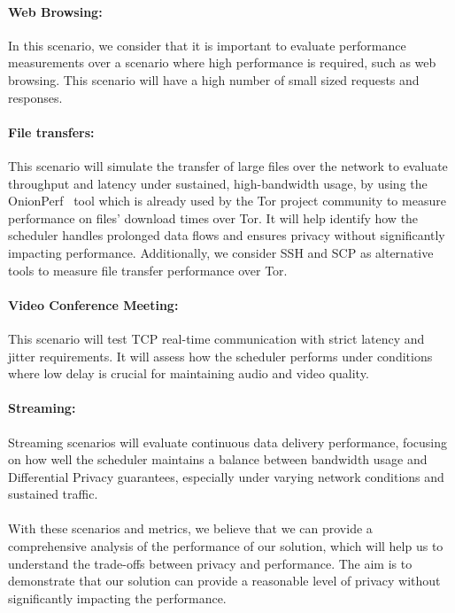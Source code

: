 \paragraph{Web Browsing:} In this scenario, we consider that it is important to evaluate performance measurements over a scenario where high performance is required, such as web browsing. This scenario will have a high number of small sized requests and responses. 

\paragraph{File transfers:} This scenario will simulate the transfer of large files over the network to evaluate throughput and latency under sustained, high-bandwidth usage, by using the OnionPerf~\cite{OnionPerf} tool which is already used by the Tor project community to measure performance on files' download times over Tor. It will help identify how the scheduler handles prolonged data flows and ensures privacy without significantly impacting performance. Additionally, we consider SSH and SCP as alternative tools to measure file transfer performance over Tor.

\paragraph{Video Conference Meeting:} This scenario will test TCP real-time communication with strict latency and jitter requirements. It will assess how the scheduler performs under conditions where low delay is crucial for maintaining audio and video quality.  

\paragraph{Streaming:} Streaming scenarios will evaluate continuous data delivery performance, focusing on how well the scheduler maintains a balance between bandwidth usage and Differential Privacy guarantees, especially under varying network conditions and sustained traffic.

\paragraph{} With these scenarios and metrics, we believe that we can provide a comprehensive analysis of the performance of our solution, which will help us to understand the trade-offs between privacy and performance. The aim is to demonstrate that our solution can provide a reasonable level of privacy without significantly impacting the performance.

